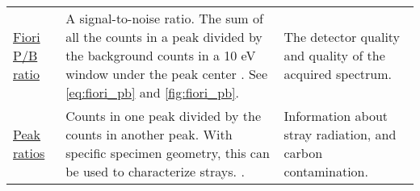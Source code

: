 \begin{table}[htp]
\begin{tabular}{p{2.5cm}p{8cm}p{4cm}}
        \hyperref[theory:eds_performance:fiori]{Fiori P/B ratio}                      & A signal-to-noise ratio. The sum of all the counts in a peak divided by the background counts in a 10 eV window under the peak center  \cite{fiori_peak_background_1982,williams_carter_tem_2009}. See \cref{eq:fiori_pb} and \cref{fig:fiori_pb}.          & The detector quality and quality of the acquired spectrum.         \\
        \hyperref[theory:eds_performance:peakratio]{Peak ratios}                      & Counts in one peak divided by the counts in another peak. With specific specimen geometry, this can be used to characterize strays. \cite{egerton_nio_characterization_1994,ted_pella_nio_tem_2019}.                                                        & Information about stray radiation, and carbon contamination.       \\
        \hline
    \end{tabular}
\end{table}